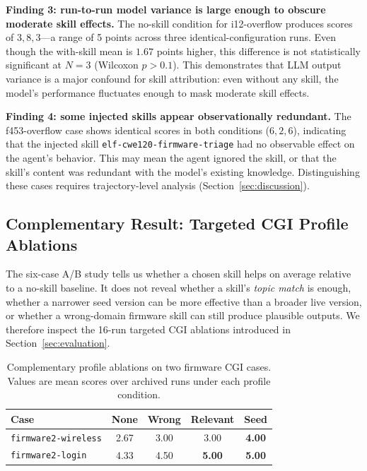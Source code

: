 ﻿\documentclass[preprint,12pt]{elsarticle}
\begin{document}
\textbf{Finding 3: run-to-run model variance is large enough to obscure
moderate skill effects.}
The no-skill condition for i12-overflow produces scores of $3, 8, 3$---a
range of 5 points across three identical-configuration runs.  Even though
the with-skill mean is $1.67$ points higher, this difference is not
statistically significant at $N=3$ (Wilcoxon $p > 0.1$).  This demonstrates
that LLM output variance is a major confound for skill attribution: even
without any skill, the model's performance fluctuates enough to mask
moderate skill effects.

\textbf{Finding 4: some injected skills appear observationally redundant.}
The f453-overflow case shows identical scores in both conditions
($6, 2, 6$), indicating that the injected skill \texttt{elf-cwe120-firmware-triage}
had no observable effect on the agent's behavior.  This may mean the agent
ignored the skill, or that the skill's content was redundant with the
model's existing knowledge.  Distinguishing these cases requires
trajectory-level analysis (Section~\ref{sec:discussion}).

\subsection{Complementary Result: Targeted CGI Profile Ablations}
\label{sec:results_ablation}

The six-case A/B study tells us whether a chosen skill helps on average
relative to a no-skill baseline.  It does not reveal whether a skill's
\emph{topic match} is enough, whether a narrower seed version can be more
effective than a broader live version, or whether a wrong-domain firmware
skill can still produce plausible outputs.  We therefore inspect the 16-run
targeted CGI ablations introduced in
Section~\ref{sec:evaluation}.

\begin{table}[t]
\centering
\caption{Complementary profile ablations on two firmware CGI cases.  Values
are mean scores over archived runs under each profile condition.}
\label{tab:profile_ablation}
\footnotesize
\begin{tabular}{lcccc}
\toprule
Case & None & Wrong & Relevant & Seed \\
\midrule
\texttt{firmware2-wireless} & 2.67 & 3.00 & 3.00 & \textbf{4.00} \\
\texttt{firmware2-login} & 4.33 & 4.50 & \textbf{5.00} & \textbf{5.00} \\
\bottomrule
\end{tabular}
\end{table}
\end{document}
